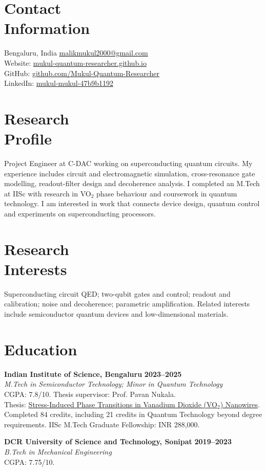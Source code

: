 \documentclass[margin,line]{resume}
\newcommand{\projectlink}[2]{\href{https://mukul-quantum-researcher.github.io/projects/#1/}{#2}}
\newcommand{\cvheading}[1]{\section{\mysidestyle #1}}
\begin{document}
\begin{resume}

\cvheading{Contact\\Information}
Bengaluru, India \hfill \href{mailto:malikmukul2000@gmail.com}{malikmukul2000@gmail.com}\\
Website: \href{https://mukul-quantum-researcher.github.io/}{mukul-quantum-researcher.github.io}\\
GitHub: \href{https://github.com/Mukul-Quantum-Researcher}{github.com/Mukul-Quantum-Researcher}\\
LinkedIn: \href{https://www.linkedin.com/in/mukul-mukul-47b9b1192/}{mukul-mukul-47b9b1192}

\cvheading{Research\\Profile}
Project Engineer at C-DAC working on superconducting quantum circuits. My experience includes circuit and electromagnetic simulation, cross-resonance gate modelling, readout-filter design and decoherence analysis. I completed an M.Tech at IISc with research in VO$_2$ phase behaviour and coursework in quantum technology. I am interested in work that connects device design, quantum control and experiments on superconducting processors.

\cvheading{Research\\Interests}
Superconducting circuit QED; two-qubit gates and control; readout and calibration; noise and decoherence; parametric amplification. Related interests include semiconductor quantum devices and low-dimensional materials.

\cvheading{Education}
\textbf{Indian Institute of Science, Bengaluru} \hfill \textbf{2023--2025}\\
\textsl{M.Tech in Semiconductor Technology; Minor in Quantum Technology}\\
CGPA: 7.8/10. Thesis supervisor: Prof. Pavan Nukala.\\
Thesis: \projectlink{vo2-thesis}{Stress-Induced Phase Transitions in Vanadium Dioxide (VO$_2$) Nanowires}.\\
Completed 84 credits, including 21 credits in Quantum Technology beyond degree requirements. IISc M.Tech Graduate Fellowship: INR 288,000.

\vspace{1mm}
\textbf{DCR University of Science and Technology, Sonipat} \hfill \textbf{2019--2023}\\
\textsl{B.Tech in Mechanical Engineering}\\
CGPA: 7.75/10.


\end{resume}
\end{document}
